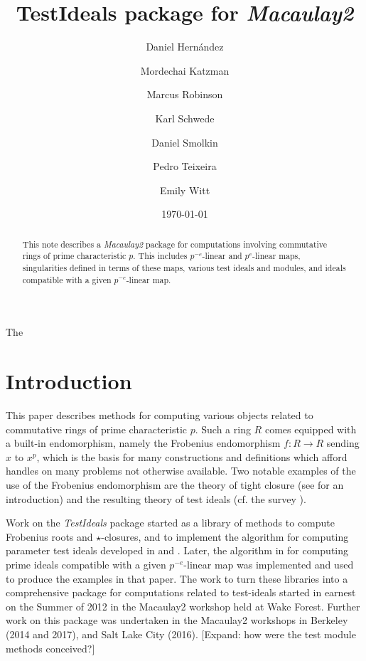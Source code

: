 \documentclass[11pt]{amsart}
\begin{document}
The \title{{TestIdeals} package for \emph{Macaulay2}}
\author{Daniel Hern\'andez}
\author{Mordechai Katzman}
\author{Marcus Robinson}
\author{Karl Schwede}
\author{Daniel Smolkin}
\author{Pedro Teixeira}
\author{Emily Witt}
\date{\today}
\address{Department of Mathematics, University of Utah, 155 S 1400 E Room 233, Salt Lake City, UT, 84112}

\begin{abstract}
  This note describes a \emph{Macaulay2} package for computations involving commutative rings of prime characteristic $p$.
  This includes $p^{-e}$-linear and $p^{e}$-linear  maps,
  singularities defined in terms of these maps,  various test ideals and modules, and ideals compatible with a given $p^{-e}$-linear map.
\end{abstract}




\maketitle

\section{Introduction}

This paper describes methods for computing various objects related to commutative rings of prime characteristic $p$.
Such a ring $R$ comes equipped with a built-in endomorphism, namely the Frobenius endomorphism $f:R \rightarrow R$ sending $x$ to $x^p$, which is the basis for many constructions and definitions
which afford handles on many problems not otherwise available. Two notable examples of the use of the Frobenius endomorphism are the theory of tight closure
(see \cite{HochsterHunekeTC1} for an introduction)
and the resulting theory of test ideals
(cf. the survey \cite{SchwedeTuckerTestIdealSurvey}).

Work on the \emph{TestIdeals} package started as a library of methods to compute  Frobenius roots  and $\star$-closures, and to implement the algorithm for computing parameter test ideals
developed in \cite{KatzmanParameterTestIdealOfCMRings} and \cite{KatzmanFrobeniusMapsOnInjectiveHulls}.
Later, the algorithm in  \cite{KatzmanSchwedeAlgorithm} for computing prime ideals compatible with a given $p^{-e}$-linear map was implemented and
used to produce the examples in that paper. The work to turn these libraries into a comprehensive package for computations related to test-ideals
started in earnest on the Summer of 2012 in the Macaulay2 workshop held at Wake Forest. Further work on this package was undertaken in the Macaulay2 workshops in
Berkeley (2014 and 2017), and Salt Lake City (2016).
{\hfill\large\color{red} [Expand: how were the test module methods conceived?]}\\
\end{document}
